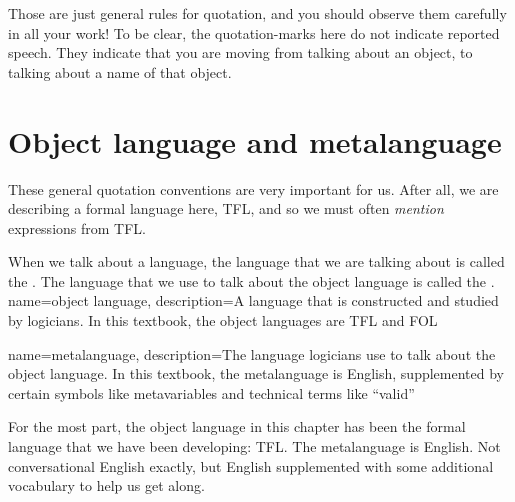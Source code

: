 Those are just general rules for quotation, and you should observe them carefully in all your work! To be clear, the quotation-marks here do not indicate reported speech. They indicate that you are moving from talking about an object, to talking about a name of that object. 



\section{Object language and metalanguage}
These general quotation conventions are very important for us. After all, we are describing a formal language here, TFL, and so we must often \emph{mention} expressions from TFL.

When we talk about a language, the language that we are talking about is called the . The language that we use to talk about the object language is called the .
\label{def.metalanguage}
{
name=object language,
description={A language that is constructed and studied by logicians. In this textbook,
 the object languages are TFL and FOL}
}

{
name=metalanguage,
description={The language logicians use to talk about the object language. In this textbook, the metalanguage is English, supplemented by certain symbols like metavariables and technical terms like ``valid''}
}

For the most part, the object language in this chapter has been the formal language that we have been developing: TFL. The metalanguage is English. Not conversational English exactly, but English supplemented with some additional vocabulary to help us get along.

